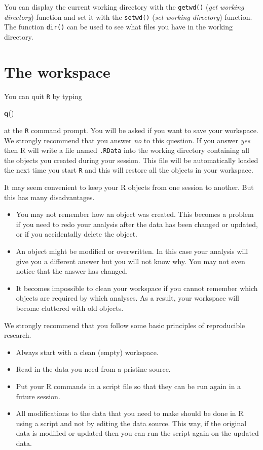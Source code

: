 \documentclass[
]{book}
\newenvironment{Shaded}{\begin{snugshade}}{\end{snugshade}}
\newcommand{\FunctionTok}[1]{\textcolor[rgb]{0.13,0.29,0.53}{\textbf{#1}}}
\newcommand{\NormalTok}[1]{#1}
\providecommand{\tightlist}{%
  \setlength{\itemsep}{0pt}\setlength{\parskip}{0pt}}
\theoremstyle{definition}
\theoremstyle{definition}
\theoremstyle{definition}
\theoremstyle{definition}
\theoremstyle{remark}
\begin{document}
You can display the current working directory with the \texttt{getwd()}
(\emph{get working directory}) function and set it with the \texttt{setwd()}
(\emph{set working directory}) function. The function \texttt{dir()} can be
used to see what files you have in the working directory.

\section{The workspace}\label{the-workspace}

You can quit \texttt{R} by typing

\begin{Shaded}
\begin{Highlighting}[]
\FunctionTok{q}\NormalTok{()}
\end{Highlighting}
\end{Shaded}

at the \texttt{R} command prompt. You will be asked if you want to
save your workspace. We strongly recommend that you answer \emph{no} to this
question. If you answer \emph{yes} then R will write a file named
\texttt{.RData} into the working directory containing all the objects
you created during your session. This file will be automatically loaded
the next time you start \texttt{R} and this will restore all the objects
in your workspace.

It may seem convenient to keep your R objects from one session to another.
But this has many disadvantages.

\begin{itemize}
\tightlist
\item
  You may not remember how an object was created. This becomes a
  problem if you need to redo your analysis after the data has been
  changed or updated, or if you accidentally delete the object.
\item
  An object might be modified or overwritten. In this case your
  analysis will give you a different answer but you will not know why.
  You may not even notice that the answer has changed.
\item
  It becomes impossible to clean your workspace if you cannot
  remember which objects are required by which analyses. As a result,
  your workspace will become cluttered with old objects.
\end{itemize}

We strongly recommend that you follow some basic principles of
reproducible research.

\begin{itemize}
\tightlist
\item
  Always start with a clean (empty) workspace.
\item
  Read in the data you need from a pristine source.
\item
  Put your R commands in a script file so that they can be run
  again in a future session.
\item
  All modifications to the data that you need to make should be
  done in R using a script and not by editing the data source. This
  way, if the original data is modified or updated then you can run
  the script again on the updated data.
\end{itemize}
\end{document}
